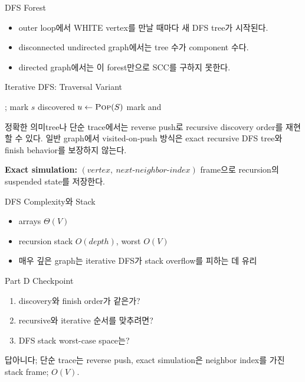 \begin{frame}{DFS Forest}
\begin{itemize}\item outer loop에서 WHITE vertex를 만날 때마다 새 DFS tree가 시작된다.\item disconnected undirected graph에서는 tree 수가 component 수다.\item directed graph에서는 이 forest만으로 SCC를 구하지 못한다.\end{itemize}
\end{frame}
\begin{frame}{Iterative DFS: Traversal Variant}
\algofont\begin{algorithmic}[1]\State {}; mark \(s\) discovered
\State \(u\gets\Call{Pop}{S}\)
\State mark and \EndIf\EndFor\EndWhile\end{algorithmic}
\begin{alertblock}{정확한 의미}tree나 단순 trace에서는 reverse push로 recursive discovery order를 재현할 수 있다. 일반 graph에서 visited-on-push 방식은 exact recursive DFS tree와 finish behavior를 보장하지 않는다.\end{alertblock}
\textbf{Exact simulation:} \((vertex,\ next\text{-}neighbor\text{-}index)\) frame으로 recursion의 suspended state를 저장한다.
\end{frame}
\begin{frame}{DFS Complexity와 Stack}
\begin{itemize}\item arrays \(\Theta(V)\)\item recursion stack \(O(depth)\), worst \(O(V)\)\item 매우 깊은 graph는 iterative DFS가 stack overflow를 피하는 데 유리\end{itemize}
\end{frame}
\begin{frame}{Part D Checkpoint}
\begin{enumerate}\item discovery와 finish order가 같은가?\item recursive와 iterative 순서를 맞추려면?\item DFS stack worst-case space는?\end{enumerate}
\begin{exampleblock}{답}아니다; 단순 trace는 reverse push, exact simulation은 neighbor index를 가진 stack frame; \(O(V)\).\end{exampleblock}
\end{frame}
